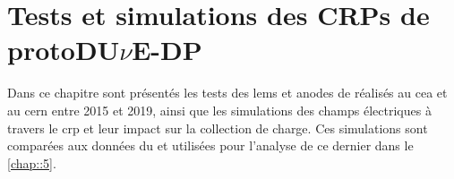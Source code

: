 \chapter{Tests et simulations des CRPs de \texorpdfstring{protoDU$\nu$E}{protoDUNE}-DP}\label{chap::4}
    
  Dans ce chapitre sont présentés les tests des \glspl{lem} et anodes de \protodp{} réalisés au \gls{cea} et au \gls{cern} entre 2015 et 2019, ainsi que les simulations des champs électriques à travers le \gls{crp} et leur impact sur la collection de charge. Ces simulations sont comparées aux données du \TOO{} et utilisées pour l'analyse de ce dernier dans le \autoref{chap::5}.
    
